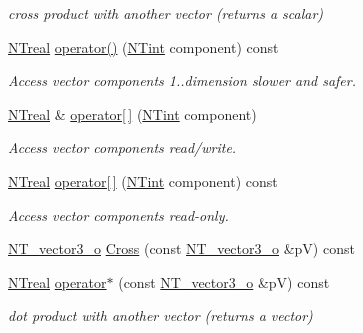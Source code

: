 \begin{DoxyCompactItemize}
\begin{DoxyCompactList}\small\item\em cross product with another vector (returns a scalar) \item\end{DoxyCompactList}\item 
\hyperlink{nt__types_8h_a814a97893e9deb1eedcc7604529ba80d}{NTreal} \hyperlink{class_n_t__vector3__o_aa2147f459ddf6e86fb23cc84c2dd9059}{operator()} (\hyperlink{nt__types_8h_aee8aa0a9869e8b5c97c6c02217ff09cd}{NTint} component) const 
\begin{DoxyCompactList}\small\item\em Access vector components 1..dimension slower and safer. \item\end{DoxyCompactList}\item 
\hyperlink{nt__types_8h_a814a97893e9deb1eedcc7604529ba80d}{NTreal} \& \hyperlink{class_n_t__vector3__o_a549701e325aa4af67664423823a66dc6}{operator\mbox{[}$\,$\mbox{]}} (\hyperlink{nt__types_8h_aee8aa0a9869e8b5c97c6c02217ff09cd}{NTint} component)
\begin{DoxyCompactList}\small\item\em Access vector components read/write. \item\end{DoxyCompactList}\item 
\hyperlink{nt__types_8h_a814a97893e9deb1eedcc7604529ba80d}{NTreal} \hyperlink{class_n_t__vector3__o_a412ccaff1abe163a74ffd5cf7fc40364}{operator\mbox{[}$\,$\mbox{]}} (\hyperlink{nt__types_8h_aee8aa0a9869e8b5c97c6c02217ff09cd}{NTint} component) const 
\begin{DoxyCompactList}\small\item\em Access vector components read-\/only. \item\end{DoxyCompactList}\item 
\hyperlink{class_n_t__vector3__o}{NT\_\-vector3\_\-o} \hyperlink{class_n_t__vector3__o_a0844de07239520660fcd9112ee2ce090}{Cross} (const \hyperlink{class_n_t__vector3__o}{NT\_\-vector3\_\-o} \&pV) const 
\item 
\hyperlink{nt__types_8h_a814a97893e9deb1eedcc7604529ba80d}{NTreal} \hyperlink{class_n_t__vector3__o_af43213780f86052c1f84a577df6b4474}{operator$\ast$} (const \hyperlink{class_n_t__vector3__o}{NT\_\-vector3\_\-o} \&pV) const 
\begin{DoxyCompactList}\small\item\em dot product with another vector (returns a vector) \item\end{DoxyCompactList}\item 

\end{DoxyCompactItemize}
